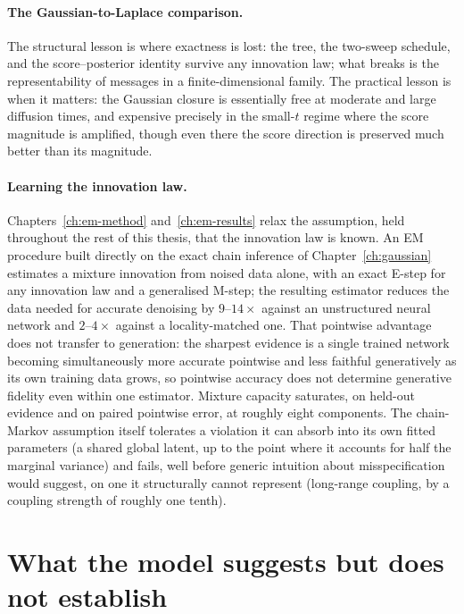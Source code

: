 \paragraph{The Gaussian-to-Laplace comparison.} The structural lesson is
where exactness is lost: the tree, the two-sweep schedule, and the
score--posterior identity survive any innovation law; what breaks is the
representability of messages in a finite-dimensional family. The
practical lesson is when it matters: the Gaussian closure is essentially
free at moderate and large diffusion times, and expensive precisely in
the small-$t$ regime where the score magnitude is amplified, though even
there the score direction is preserved much better than its magnitude.

\paragraph{Learning the innovation law.} Chapters~\ref{ch:em-method}
and~\ref{ch:em-results} relax the assumption, held throughout the rest of
this thesis, that the innovation law is known. An EM procedure built
directly on the exact chain inference of Chapter~\ref{ch:gaussian} estimates
a mixture innovation from noised data alone, with an exact E-step for any
innovation law and a generalised M-step; the resulting estimator reduces the
data needed for accurate denoising by $9$--$14\times$ against an unstructured
neural network and $2$--$4\times$ against a locality-matched one. That
pointwise advantage does not transfer to generation: the sharpest evidence
is a single trained network becoming simultaneously more accurate pointwise
and less faithful generatively as its own training data grows, so pointwise
accuracy does not determine generative fidelity even within one estimator.
Mixture capacity saturates, on held-out evidence and on paired pointwise
error, at roughly eight components. The chain-Markov assumption itself
tolerates a violation it can absorb into its own fitted parameters (a
shared global latent, up to the point where it accounts for half the
marginal variance) and fails, well before generic intuition about
misspecification would suggest, on one it structurally cannot represent
(long-range coupling, by a coupling strength of roughly one tenth).

\section{What the model suggests but does not establish}

